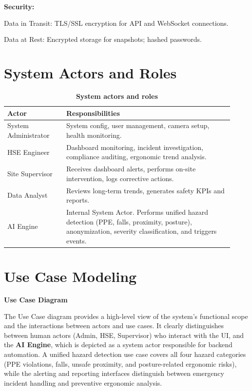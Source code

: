 \textbf{Security:}

Data in Transit: TLS/SSL encryption for API and WebSocket connections.

Data at Rest: Encrypted storage for snapshots; hashed passwords.

\section{System Actors and Roles}

\begin{table}[H]
\centering
\small
\renewcommand{\arraystretch}{1.2}
\begin{tabular}{|
>{\RaggedRight\arraybackslash}p{0.24\linewidth}|
>{\RaggedRight\arraybackslash}p{0.68\linewidth}|}
\hline
\textbf{Actor} & \textbf{Responsibilities} \\
\hline
System Administrator & System config, user management, camera setup, health monitoring. \\
\hline
HSE Engineer & Dashboard monitoring, incident investigation, compliance auditing, ergonomic trend analysis. \\
\hline
Site Supervisor & Receives dashboard alerts, performs on-site intervention, logs corrective actions. \\
\hline
Data Analyst & Reviews long-term trends, generates safety KPIs and reports. \\
\hline
AI Engine & Internal System Actor. Performs unified hazard detection (PPE, falls, proximity, posture), anonymization, severity classification, and triggers events. \\
\hline
\end{tabular}
\caption{\textbf{System actors and roles}}
\end{table}

\section{Use Case Modeling}

\textbf{Use Case Diagram}

The Use Case diagram provides a high-level view of the system's functional scope and the interactions between actors and use cases. It clearly distinguishes between human actors (Admin, HSE, Supervisor) who interact with the UI, and the \textbf{AI Engine}, which is depicted as a system actor responsible for backend automation. A unified hazard detection use case covers all four hazard categories (PPE violations, falls, unsafe proximity, and posture-related ergonomic risks), while the alerting and reporting interfaces distinguish between emergency incident handling and preventive ergonomic analysis.

